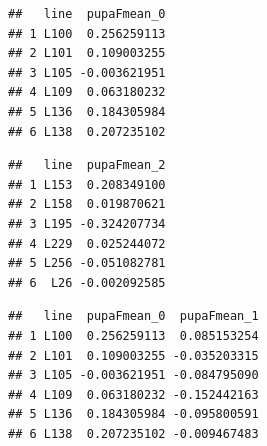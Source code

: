 \documentclass[
]{article}
\newenvironment{Shaded}{\begin{snugshade}}{\end{snugshade}}
\newcommand{\CommentTok}[1]{\textcolor[rgb]{0.56,0.35,0.01}{\textit{#1}}}
\newcommand{\DataTypeTok}[1]{\textcolor[rgb]{0.13,0.29,0.53}{#1}}
\newcommand{\DecValTok}[1]{\textcolor[rgb]{0.00,0.00,0.81}{#1}}
\newcommand{\KeywordTok}[1]{\textcolor[rgb]{0.13,0.29,0.53}{\textbf{#1}}}
\newcommand{\NormalTok}[1]{#1}
\newcommand{\OperatorTok}[1]{\textcolor[rgb]{0.81,0.36,0.00}{\textbf{#1}}}
\newcommand{\StringTok}[1]{\textcolor[rgb]{0.31,0.60,0.02}{#1}}
\begin{document}
\begin{verbatim}
##   line  pupaFmean_0
## 1 L100  0.256259113
## 2 L101  0.109003255
## 3 L105 -0.003621951
## 4 L109  0.063180232
## 5 L136  0.184305984
## 6 L138  0.207235102
\end{verbatim}

\begin{Shaded}
\end{Shaded}

\begin{verbatim}
##   line  pupaFmean_2
## 1 L153  0.208349100
## 2 L158  0.019870621
## 3 L195 -0.324207734
## 4 L229  0.025244072
## 5 L256 -0.051082781
## 6  L26 -0.002092585
\end{verbatim}

\begin{Shaded}
\end{Shaded}

\begin{verbatim}
##   line  pupaFmean_0  pupaFmean_1
## 1 L100  0.256259113  0.085153254
## 2 L101  0.109003255 -0.035203315
## 3 L105 -0.003621951 -0.084795090
## 4 L109  0.063180232 -0.152442163
## 5 L136  0.184305984 -0.095800591
## 6 L138  0.207235102 -0.009467483
\end{verbatim}

\begin{Shaded}
\end{Shaded}
\end{document}
